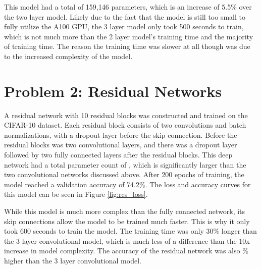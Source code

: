 \documentclass{article}
\begin{document}
\begin{enumerate}[label=\alph*. ]
     This model had a total of 159,146 parameters, which is an increase of 5.5\% over the two layer model.  Likely due to the fact that the model is still too small to fully utilize the A100 GPU, the 3 layer model only took 500 seconds to train, which is not much more than the 2 layer model's training time and the majority of training time. The reason the training time was slower at all though was due to the increased complexity of the model.     

\end{enumerate}
\section{Problem 2: Residual Networks}
A residual network with 10 residual blocks was constructed and trained on the CIFAR-10 dataset. Each residual block consists of two convolutions and batch normalizations, with a dropout layer before the skip connection. Before the residual blocks was two convolutional layers, and there was a dropout layer followed by two fully connected layers after the residual blocks. This deep network had a total parameter count of , which is significantly larger than the two convolutional networks discussed above. After 200 epochs of training, the model reached a validation accuracy of 74.2\%. The loss and accuracy curves for this model can be seen in Figure \ref{fig:res_loss}.

While this model is much more complex than the fully connected network, its skip connections allow the model to be trained much faster. This is why it only took 600 seconds to train the model. The training time was only 30\% longer than the 3 layer convolutional model, which is much less of a difference than the 10x increase in model complexity. The accuracy of the residual network was also \% higher than the 3 layer convolutional model.
\end{document}
